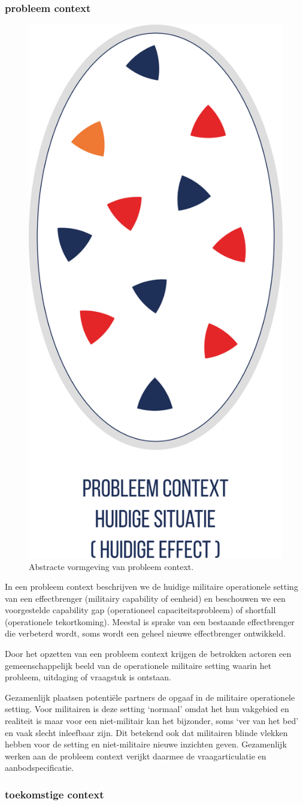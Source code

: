 \documentclass[
]{book}
\begin{document}
\hypertarget{probleem-context}{%
\subsubsection{probleem context}\label{probleem-context}}

\begin{figure}

{\centering \includegraphics[width=0.2\linewidth]{data/images/20210324-MDI-eieren-beweging-1} 

}

\caption{Abstracte vormgeving van probleem context.}\label{fig:eieren-in-beweging-1}
\end{figure}

In een probleem context beschrijven we de huidige militaire operationele setting van een effectbrenger (militairy capability of eenheid) en beschouwen we een voorgestelde capability gap (operationeel capaciteitsprobleem) of shortfall (operationele tekortkoming). Meestal is sprake van een bestaande effectbrenger die verbeterd wordt, soms wordt een geheel nieuwe effectbrenger ontwikkeld.

Door het opzetten van een probleem context krijgen de betrokken actoren een gemeenschappelijk beeld van de operationele militaire setting waarin het probleem, uitdaging of vraagstuk is ontstaan.

Gezamenlijk plaatsen potentiële partners de opgaaf in de militaire operationele setting. Voor militairen is deze setting `normaal' omdat het hun vakgebied en realiteit is maar voor een niet-militair kan het bijzonder, soms `ver van het bed' en vaak slecht inleefbaar zijn. Dit betekend ook dat militairen blinde vlekken hebben voor de setting en niet-militaire nieuwe inzichten geven. Gezamenlijk werken aan de probleem context verijkt daarmee de vraagarticulatie en aanbodspecificatie.

\hypertarget{toekomstige-context}{%
\subsubsection{toekomstige context}\label{toekomstige-context}}
\end{document}
